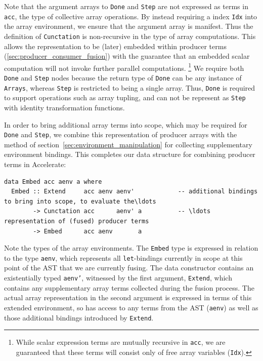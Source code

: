 Note that the argument arrays to \texttt{Done} and \texttt{Step} are not
expressed as terms in \texttt{acc}, the type of collective array operations. By
instead requiring a  index \texttt{Idx} into the array
environment, we ensure that the argument array is manifest. Thus the definition
of \texttt{Cunctation} is non-recursive in the type of array computations. This
allows the representation to be (later) embedded within producer terms
(\ref{sec:producer_consumer_fusion}) with the guarantee that an embedded scalar
computation will not invoke further parallel computations.%
\footnote{While scalar expression terms are mutually recursive in \texttt{acc},
we are guaranteed that these terms will consist only of free array variables
(\texttt{Idx}).}
We require both \texttt{Done} and \texttt{Step} nodes because the return type of
\texttt{Done} can be any instance of \texttt{Arrays}, whereas \texttt{Step} is
restricted to being a single array. Thus, \texttt{Done} is required to support
operations such as array tupling, and can not be represent as \texttt{Step} with
identity transformation functions.

In order to bring additional array terms into scope, which may be required for
\texttt{Done} and \texttt{Step}, we combine this representation of producer
arrays with the method of section~\ref{sec:environment_manipulation} for
collecting supplementary environment bindings. This completes our data structure
for combining producer terms in Accelerate:
%
\begin{lstlisting}[style=haskell,
    caption={Representation of fused producer arrays in Accelerate}]
data Embed acc aenv a where
  Embed :: Extend     acc aenv aenv'            -- additional bindings to bring into scope, to evaluate the\ldots
        -> Cunctation acc      aenv' a          -- \ldots representation of (fused) producer terms
        -> Embed      acc aenv       a
\end{lstlisting}

Note the types of the array environments. The \texttt{Embed} type is expressed
in relation to the type \texttt{aenv}, which represents all
\texttt{let}-bindings currently in scope at this point of the AST that we are currently fusing. The data constructor contains an
existentially typed \texttt{aenv'}, witnessed by the first argument,
\texttt{Extend}, which contains any supplementary array terms collected during
the fusion process. The actual array representation in the second argument is
expressed in terms of this extended environment, so has access to any terms from
the AST (\texttt{aenv}) as well as those additional bindings introduced by
\texttt{Extend}.

